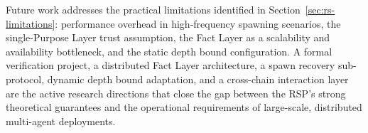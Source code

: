 Future work addresses the practical limitations identified in Section~\ref{sec:rs-limitations}: performance overhead in high-frequency spawning scenarios, the single-Purpose Layer trust assumption, the Fact Layer as a scalability and availability bottleneck, and the static depth bound configuration. A formal verification project, a distributed Fact Layer architecture, a spawn recovery sub-protocol, dynamic depth bound adaptation, and a cross-chain interaction layer are the active research directions that close the gap between the RSP's strong theoretical guarantees and the operational requirements of large-scale, distributed multi-agent deployments.

